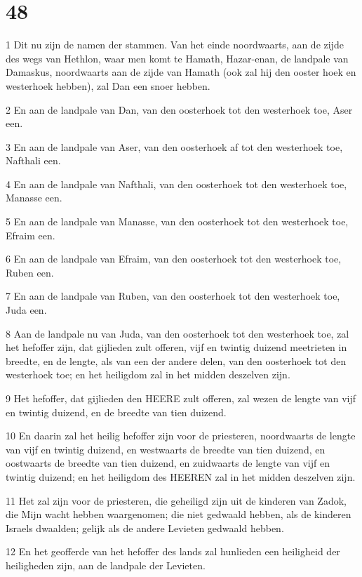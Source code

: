 \chapter{48}

\par 1 Dit nu zijn de namen der stammen. Van het einde noordwaarts, aan de zijde des wegs van Hethlon, waar men komt te Hamath, Hazar-enan, de landpale van Damaskus, noordwaarts aan de zijde van Hamath (ook zal hij den ooster hoek en westerhoek hebben), zal Dan een snoer hebben.
\par 2 En aan de landpale van Dan, van den oosterhoek tot den westerhoek toe, Aser een.
\par 3 En aan de landpale van Aser, van den oosterhoek af tot den westerhoek toe, Nafthali een.
\par 4 En aan de landpale van Nafthali, van den oosterhoek tot den westerhoek toe, Manasse een.
\par 5 En aan de landpale van Manasse, van den oosterhoek tot den westerhoek toe, Efraim een.
\par 6 En aan de landpale van Efraim, van den oosterhoek tot den westerhoek toe, Ruben een.
\par 7 En aan de landpale van Ruben, van den oosterhoek tot den westerhoek toe, Juda een.
\par 8 Aan de landpale nu van Juda, van den oosterhoek tot den westerhoek toe, zal het hefoffer zijn, dat gijlieden zult offeren, vijf en twintig duizend meetrieten in breedte, en de lengte, als van een der andere delen, van den oosterhoek tot den westerhoek toe; en het heiligdom zal in het midden deszelven zijn.
\par 9 Het hefoffer, dat gijlieden den HEERE zult offeren, zal wezen de lengte van vijf en twintig duizend, en de breedte van tien duizend.
\par 10 En daarin zal het heilig hefoffer zijn voor de priesteren, noordwaarts de lengte van vijf en twintig duizend, en westwaarts de breedte van tien duizend, en oostwaarts de breedte van tien duizend, en zuidwaarts de lengte van vijf en twintig duizend; en het heiligdom des HEEREN zal in het midden deszelven zijn.
\par 11 Het zal zijn voor de priesteren, die geheiligd zijn uit de kinderen van Zadok, die Mijn wacht hebben waargenomen; die niet gedwaald hebben, als de kinderen Israels dwaalden; gelijk als de andere Levieten gedwaald hebben.
\par 12 En het geofferde van het hefoffer des lands zal hunlieden een heiligheid der heiligheden zijn, aan de landpale der Levieten.
